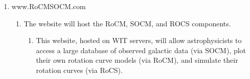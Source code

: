 \documentclass[titlepage]{article}
\begin{document}
\begin{enumerate}
  	\item www.RoCMSOCM.com
    	\begin{enumerate}
        	\item The website will host the RoCM, SOCM, and ROCS components.
        	\begin{enumerate}
              \item This website, hosted on WIT servers, will allow astrophysicists to access a large database of observed galactic data (via SOCM), plot their own rotation curve models (via RoCM), and simulate their rotation curves (via RoCS).
        	\end{enumerate}
        \end{enumerate}
    
   
\end{enumerate}
\end{document}

